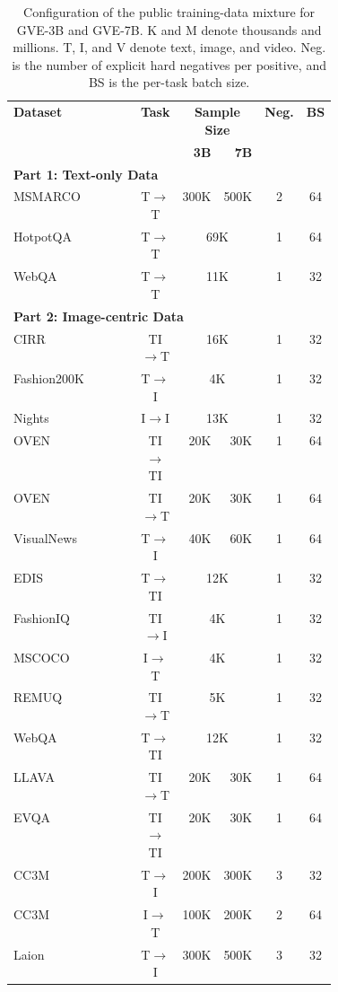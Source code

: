 \begin{table}[!t]
\centering
\caption{Configuration of the public training-data mixture for GVE-3B and GVE-7B. K and M denote thousands and millions. T, I, and V denote text, image, and video. Neg. is the number of explicit hard negatives per positive, and BS is the per-task batch size.}
\label{gve:tab:main_training_data}
\footnotesize
\begin{tabular}{@{}p{0.42\linewidth}crrcc@{}}
\toprule
\textbf{Dataset} & \textbf{Task} & \multicolumn{2}{c}{\textbf{Sample Size}} & \textbf{Neg.} & \textbf{BS} \\
\cmidrule(lr){3-4}
& & \textbf{3B} & \textbf{7B} & & \\
\midrule
\multicolumn{6}{l}{\textbf{Part 1: Text-only Data}} \\
MSMARCO & T$\to$T & 300K & 500K & 2 & 64 \\
HotpotQA & T$\to$T & \multicolumn{2}{c}{69K} & 1 & 64 \\
WebQA & T$\to$T & \multicolumn{2}{c}{11K} & 1 & 32 \\
\midrule
\multicolumn{6}{l}{\textbf{Part 2: Image-centric Data}} \\
CIRR & TI$\to$T & \multicolumn{2}{c}{16K} & 1 & 32 \\
Fashion200K & T$\to$I & \multicolumn{2}{c}{4K} & 1 & 32 \\
Nights & I$\to$I & \multicolumn{2}{c}{13K} & 1 & 32 \\
OVEN & TI$\to$TI & 20K & 30K & 1 & 64 \\
OVEN & TI$\to$T & 20K & 30K & 1 & 64 \\
VisualNews & T$\to$I & 40K & 60K & 1 & 64 \\
EDIS & T$\to$TI & \multicolumn{2}{c}{12K} & 1 & 32 \\
FashionIQ & TI$\to$I & \multicolumn{2}{c}{4K} & 1 & 32 \\
MSCOCO & I$\to$T & \multicolumn{2}{c}{4K} & 1 & 32 \\
REMUQ & TI$\to$T & \multicolumn{2}{c}{5K} & 1 & 32 \\
WebQA & T$\to$TI & \multicolumn{2}{c}{12K} & 1 & 32 \\
LLAVA & TI$\to$T & 20K & 30K & 1 & 64 \\
EVQA & TI$\to$TI & 20K & 30K & 1 & 64 \\
CC3M & T$\to$I & 200K & 300K & 3 & 32 \\
CC3M & I$\to$T & 100K & 200K & 2 & 64 \\
Laion & T$\to$I & 300K & 500K & 3 & 32 \\

\end{tabular}
\end{table}
